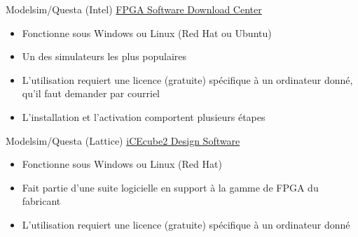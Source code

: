 \documentclass[presentation]{beamer}
\begin{document}
\begin{frame}[label={sec:org41adac2}]{Modelsim/Questa (Intel)}
\href{https://www.intel.com/content/www/us/en/collections/products/fpga/software/downloads.html?s=Newest\&f=\%255B\%257B\%2522name\%2522\%3A\%2522quartusedition\%2522\%2C\%2522facetId\%2522\%3A\%2522quartusedition\%2522\%2C\%2522currentValues\%2522\%3A\%255B\%255D\%257D\%2C\%257B\%2522name\%2522\%3A\%2522quartusaddon\%2522\%2C\%2522facetId\%2522\%3A\%2522quartusaddon\%2522\%2C\%2522currentValues\%2522\%3A\%255B\%257B\%2522value\%2522\%3A\%2522Intel\%25C2\%25AE\%2520FPGA\%2520Simulation\%2520Tools\%2522\%2C\%2522state\%2522\%3A\%2522idle\%2522\%2C\%2522children\%2522\%3A\%255B\%257B\%2522value\%2522\%3A\%2522Questa*-Intel\%25C2\%25AE\%2520FPGA\%2520Starter\%2520Edition\%2522\%2C\%2522state\%2522\%3A\%2522selected\%2522\%257D\%255D\%257D\%255D\%257D\%2C\%257B\%2522name\%2522\%3A\%2522fpgadevicefamily\%2522\%2C\%2522facetId\%2522\%3A\%2522fpgadevicefamily\%2522\%2C\%2522currentValues\%2522\%3A\%255B\%255D\%257D\%2C\%257B\%2522name\%2522\%3A\%2522fpgaplatform\%2522\%2C\%2522facetId\%2522\%3A\%2522fpgaplatform\%2522\%2C\%2522currentValues\%2522\%3A\%255B\%255D\%257D\%2C\%257B\%2522facetId\%2522\%3A\%2522os-rdc\%2522\%2C\%2522name\%2522\%3A\%2522OperatingSystem\%2522\%2C\%2522currentValues\%2522\%3A\%255B\%255D\%257D\%2C\%257B\%2522facetId\%2522\%3A\%2522\%40emtcontenttype\_en\%2522\%2C\%2522name\%2522\%3A\%2522ContentType\%2522\%2C\%2522currentValues\%2522\%3A\%255B\%255D\%257D\%2C\%257B\%2522facetId\%2522\%3A\%2522lastupdated-rdc\%2522\%2C\%2522name\%2522\%3A\%2522lastupdated\%2522\%2C\%2522currentValues\%2522\%3A\%255B\%255D\%257D\%255D\&q=lite}{FPGA Software Download Center}

\begin{itemize}
\item Fonctionne sous Windows ou Linux (Red Hat ou Ubuntu)
\item Un des simulateurs les plus populaires
\item L'utilisation requiert une licence (gratuite) spécifique à un ordinateur donné, qu'il faut demander par courriel
\item L'installation et l'activation comportent plusieurs étapes
\end{itemize}
\end{frame}

\begin{frame}[label={sec:org91d718a}]{Modelsim/Questa (Lattice)}
\href{http://www.latticesemi.com/icecube2}{iCEcube2 Design Software}

\begin{itemize}
\item Fonctionne sous Windows ou Linux (Red Hat)
\item Fait partie d'une suite logicielle en support à la gamme de FPGA du fabricant
\item L'utilisation requiert une licence (gratuite) spécifique à un ordinateur donné
\end{itemize}
\end{frame}
\end{document}
